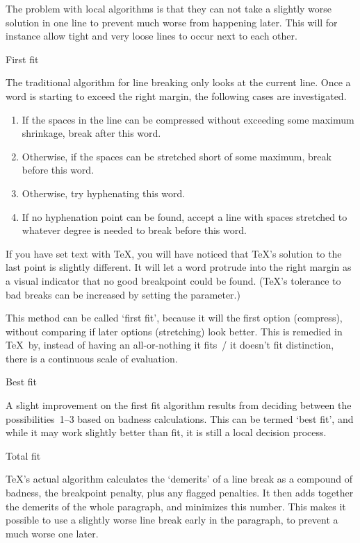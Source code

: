 The problem with local algorithms is that
they can not take a slightly worse solution in one line to prevent much
worse from happening later. This will for instance allow tight and
very loose lines
to occur next to each other.

 {First fit}

The traditional algorithm for line breaking only looks at the current
line. Once a word is starting to exceed the right margin, the
following cases are investigated.
\begin{enumerate}
\item If the spaces in the line can be compressed without exceeding
  some maximum shrinkage, break after this word.
\item Otherwise, if the spaces can be stretched short of some maximum,
  break before this word.
\item Otherwise, try hyphenating this word.
\item If no hyphenation point can be found, accept a line with spaces
  stretched to whatever degree is needed to break before this word.
\end{enumerate}

If you have set text with \TeX, you will have noticed that \TeX's
solution to the last point is slightly different. It will let a word
protrude into the right margin as a visual indicator that no good
breakpoint could be found. (\TeX's tolerance to bad breaks can be
increased by setting the  parameter.)

This method can be called `first fit', because it will the first
option (compress), without comparing if later options (stretching)
look better. This is remedied in \TeX\ by, instead of having an
all-or-nothing it fits~/ it doesn't fit distinction, there is a
continuous scale of evaluation.

 {Best fit}

A slight improvement on the first fit algorithm results from deciding
between the possibilities~1--3 based on badness calculations. This can
be termed `best fit', and while it may work slightly better than fit,
it is still a local decision process.

 {Total fit}

\TeX's actual algorithm calculates the `demerits' of a line break as a compound of badness, the
breakpoint penalty, plus any flagged penalties. 
It then adds together the demerits of the whole paragraph, and
minimizes this number. This makes it possible to use a slightly worse
line break early in the paragraph, to prevent a much worse one later.

